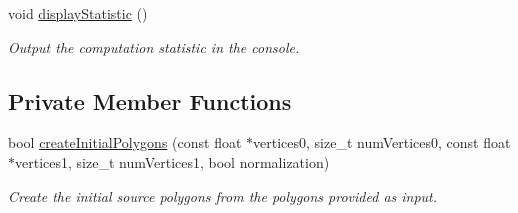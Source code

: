 \begin{DoxyCompactItemize}
\mbox{\label{classvisilib_1_1_visibility_exact_query___a7134e18dd518e8accb0f08e523149e6b}} 
void \mbox{\hyperlink{classvisilib_1_1_visibility_exact_query___a7134e18dd518e8accb0f08e523149e6b}{display\+Statistic}} ()
\begin{DoxyCompactList}\small\item\em Output the computation statistic in the console. \end{DoxyCompactList}\end{DoxyCompactItemize}
\subsection*{Private Member Functions}
\begin{DoxyCompactItemize}
\item 
bool \mbox{\hyperlink{classvisilib_1_1_visibility_exact_query___a8f1759e155f8d6e1880d725ecc74bde3}{create\+Initial\+Polygons}} (const float $\ast$vertices0, size\+\_\+t num\+Vertices0, const float $\ast$vertices1, size\+\_\+t num\+Vertices1, bool normalization)
\begin{DoxyCompactList}\small\item\em Create the initial source polygons from the polygons provided as input. \end{DoxyCompactList}\end{DoxyCompactItemize}
